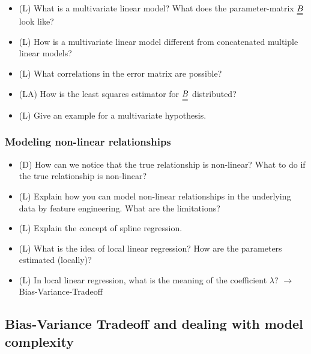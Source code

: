 \begin{itemize}
    \begin{itemize}
        \item {}
    \end{itemize}
    \answerboxM
    \item (L) What is a multivariate linear model? What does the parameter-matrix $\mat{B}$ look like?
    \answerboxM
    \item (L) How is a multivariate linear model different from concatenated multiple linear models?
    \answerboxM
    \item (L) What correlations in the error matrix are possible?
    \answerboxM
    \item (LA) How is the least squares estimator for $\mat{B}$ distributed?
    \answerboxM
    \item (L) Give an example for a multivariate hypothesis.
    \answerboxM
\end{itemize}

\subsubsection*{Modeling non-linear relationships}
\begin{itemize}
    \item (D) How can we notice that the true relationship is non-linear? What to do if the true relationship is non-linear?
    \answerboxM
    \item (L) Explain how you can model non-linear relationships in the underlying data by feature engineering. What are the limitations?
    \answerboxM
    \item (L) Explain the concept of spline regression.
    \answerboxM
    \item (L) What is the idea of local linear regression? How are the parameters estimated (locally)?
    \answerboxL
    \item (L) In local linear regression, what is the meaning of the coefficient $\lambda$? $\rightarrow$ Bias-Variance-Tradeoff
    \answerboxM
\end{itemize}

\subsection*{Bias-Variance Tradeoff and dealing with model complexity}

